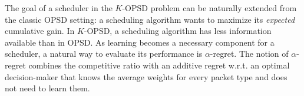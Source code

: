 The goal of a scheduler in the $K$-OPSD problem can be naturally extended from the classic OPSD setting: a scheduling algorithm \alg wants to maximize its \textit{expected} cumulative gain.
In $K$-OPSD, a scheduling algorithm has less information available than in OPSD. As learning becomes a necessary component for a scheduler, a natural way to evaluate its performance is $\alpha$-regret. The notion of $\alpha$-regret combines the competitive ratio with an additive regret w.r.t. an optimal decision-maker that knows the average weights for every packet type and does not need to learn them. 


